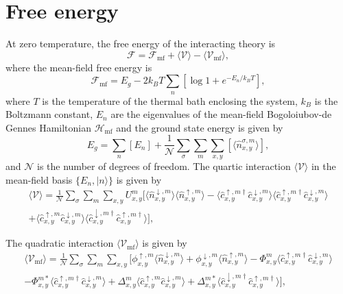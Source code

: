 \section{Free energy}
At zero temperature, the free energy of the interacting theory is 
\begin{equation}
    \mathcal{F}=
    \mathcal{F}_\text{mf}
+\langle\mathcal{V}\rangle
-\langle\mathcal{V}_\text{mf}\rangle
    ,
\end{equation}
where the mean-field free energy is
\begin{equation}
    \mathcal{F}_\text{mf}=E_g - 2 k_B T \sum_n\left[ \log{1+e^{-E_n/k_B T}}\right]
,
\end{equation}
where $T$ is the temperature of the thermal bath enclosing the system, $k_B$ is the Boltzmann constant, $E_n$ are the eigenvalues of the mean-field Bogoloiubov-de Gennes Hamiltonian $\mathcal{H}_\text{mf}$ and the ground state energy is given by
\begin{equation}
    E_g=\sum_n \left[E_n\right]  
    + \frac{1}{\mathcal{N}}\sum_\sigma\sum_m\sum_{x,y}\left[\langle \hat{n}_{x,y}^{\sigma,m} \rangle\right],
\end{equation}
and $\mathcal{N}$ is the number of degrees of freedom.
The quartic interaction
$\langle\mathcal{V}\rangle$
in the mean-field basis $\{E_n,|n\rangle\}$ is given by
\begin{multline}
    \langle\mathcal{V}\rangle=
    \frac{1}{\mathcal{N}}
    \sum_\sigma\sum_m\sum_{x,y}
    U^m_{x,y}
    \Big[
    \langle\hat{n}^{ \downarrow,m}_{ x,y }\rangle
    \langle\hat{n}^{ \uparrow,m}_{ x,y }\rangle
    -\langle\hat{c}^{ \uparrow,m \dagger }_{ x,y }\hat{c}^{ \downarrow,m }_{ x,y }\rangle
    \langle\hat{c}^{ \uparrow,m \dagger }_{ x,y }\hat{c}^{ \downarrow,m }_{ x,y }\rangle\\
    +\langle\hat{c}^{ \uparrow,m }_{ x,y }\hat{c}^{ \downarrow,m }_{ x,y }\rangle
    \langle\hat{c}^{ \downarrow,m \dagger }_{ x,y }\hat{c}^{ \uparrow,m \dagger}_{ x,y }\rangle\Big]
,
\end{multline}

The quadratic interaction
$\langle\mathcal{V}_\text{mf}\rangle$
is given by
\begin{multline}
    \langle\mathcal{V}_\text{mf}\rangle=
    \frac{1}{\mathcal{N}}
    \sum_\sigma\sum_m\sum_{x,y}
    \Big[
    \phi^{\uparrow,m}_{x,y} \langle\hat{n}^{ \downarrow,m}_{ x,y }\rangle
    +\phi^{\downarrow,m}_{x,y} \langle\hat{n}^{ \uparrow,m}_{ x,y }\rangle
    -\Phi^{m}_{x,y} \langle\hat{c}^{ \uparrow,m \dagger }_{ x,y }\hat{c}^{ \downarrow,m }_{ x,y }\rangle\\
    -\Phi^{m*}_{x,y} \langle\hat{c}^{ \uparrow,m \dagger }_{ x,y }\hat{c}^{ \downarrow,m }_{ x,y }\rangle
    +\Delta^{m}_{x,y} \langle\hat{c}^{ \uparrow,m }_{ x,y }\hat{c}^{ \downarrow,m }_{ x,y }\rangle
    +\Delta^{m*}_{x,y} \langle\hat{c}^{ \downarrow,m \dagger }_{ x,y }\hat{c}^{ \uparrow,m \dagger}_{ x,y }\rangle\Big]
,
\end{multline}


